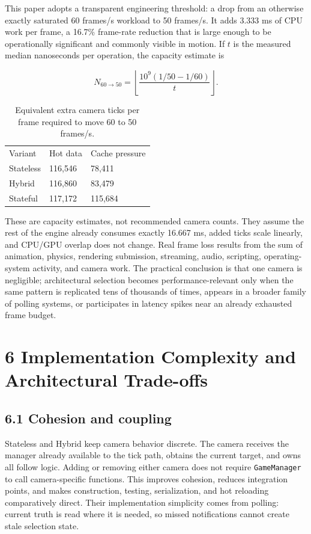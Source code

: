 This paper adopts a transparent engineering threshold: a drop from an otherwise exactly saturated 60 frames/s workload to 50 frames/s. It adds 3.333 ms of CPU work per frame, a 16.7\% frame-rate reduction that is large enough to be operationally significant and commonly visible in motion. If \(t\) is the measured median nanoseconds per operation, the capacity estimate is

\begin{equation}
N_{60\rightarrow50}=\left\lfloor\frac{10^9(1/50-1/60)}{t}\right\rfloor.
\end{equation}

\begin{table}
\caption{Equivalent extra camera ticks per frame required to move 60 to 50 frames/s.}
\begin{tabular}{lll}
Variant & Hot data & Cache pressure \\
Stateless & 116,546 & 78,411 \\
Hybrid & 116,860 & 83,479 \\
Stateful & 117,172 & 115,684 \\
\end{tabular}
\end{table}

These are capacity estimates, not recommended camera counts. They assume the rest of the engine already consumes exactly 16.667 ms, added ticks scale linearly, and CPU/GPU overlap does not change. Real frame loss results from the sum of animation, physics, rendering submission, streaming, audio, scripting, operating-system activity, and camera work. The practical conclusion is that one camera is negligible; architectural selection becomes performance-relevant only when the same pattern is replicated tens of thousands of times, appears in a broader family of polling systems, or participates in latency spikes near an already exhausted frame budget.

\section{6 Implementation Complexity and Architectural Trade-offs}

\subsection{6.1 Cohesion and coupling}

Stateless and Hybrid keep camera behavior discrete. The camera receives the manager already available to the tick path, obtains the current target, and owns all follow logic. Adding or removing either camera does not require \texttt{GameManager} to call camera-specific functions. This improves cohesion, reduces integration points, and makes construction, testing, serialization, and hot reloading comparatively direct. Their implementation simplicity comes from polling: current truth is read where it is needed, so missed notifications cannot create stale selection state.

